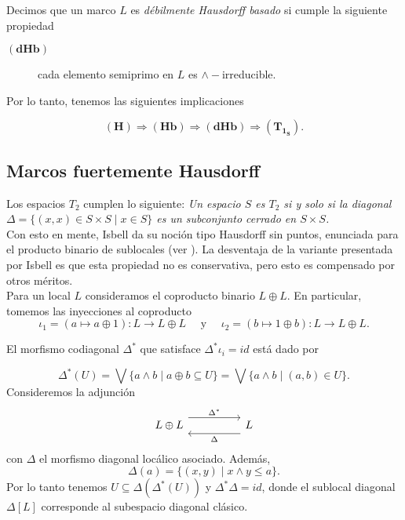 \documentclass{comunicaciones}
\begin{document}
\begin{dfn}\label{DHausdorffbasado}
    Decimos que un marco $L$ es \emph{débilmente Hausdorff basado} si cumple la siguiente propiedad
    \begin{description}
        \item[$\mathbf{(dHb)}$] cada elemento semiprimo en $L$ es $\wedge-$irreducible. 
    \end{description}
\end{dfn}

Por lo tanto, tenemos las siguientes implicaciones

\[
\mathbf{(H)}\Rightarrow \mathbf{(Hb)}\Rightarrow \mathbf{(dHb)}\Rightarrow \mathbf{(T_{1_S})}.
\]

\subsection{Marcos fuertemente Hausdorff}

Los espacios $T_2$ cumplen lo siguiente: \emph{Un espacio $S$ es $T_2$ si y solo si la diagonal $\Delta=\{(x,x)\in S\times S\mid x\in S\}$ es un subconjunto cerrado en $S\times S$.}\\

Con esto en mente, Isbell da su noción tipo Hausdorff sin puntos, enunciada para el producto binario de sublocales (ver \cite{Ib.}). La desventaja de la variante presentada por Isbell es que esta propiedad no es conservativa, pero esto es compensado por otros méritos.\\

Para un local $L$ consideramos el coproducto binario $L\oplus L$. En particular, tomemos las inyecciones al coproducto
\[
\iota_1=(a\mapsto a\oplus 1)\colon L\to L\oplus L\quad \mbox{ y }\quad \iota_2=(b\mapsto 1\oplus b)\colon L\to L\oplus L.
\]

El morfismo codiagonal $\Delta^*$ que satisface $\Delta^*\iota_i=id$ está dado por

\[
\Delta^*(U)=\bigvee\{a\wedge b\mid a\oplus b\subseteq U\}=\bigvee\{a\wedge b\mid (a, b)\in U\}. 
\]
Consideremos la adjunción
\[\begin{tikzcd}
	{L\oplus L} && L
	\arrow["{\Delta^*}", shift left=3, from=1-1, to=1-3]
	\arrow["\Delta", shift left=3, from=1-3, to=1-1]
\end{tikzcd}\]
con $\Delta$ el morfismo diagonal locálico asociado. Además, 
\[
\Delta(a)=\{(x, y)\mid x\wedge y\leq a\}.
\]
Por lo tanto tenemos $U\subseteq \Delta(\Delta^*(U))$ y $\Delta^*\Delta=id$, donde el sublocal diagonal $\Delta[L]$ corresponde al subespacio diagonal clásico.
\end{document}
